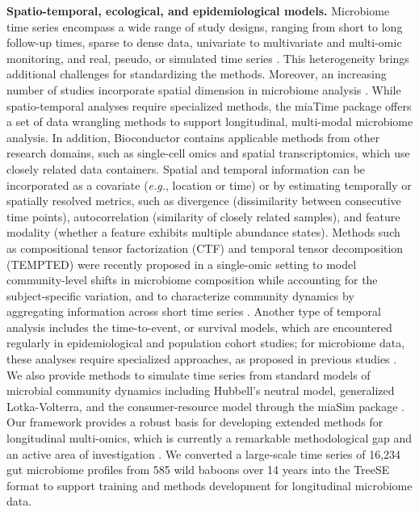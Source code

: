 \documentclass[
  sn-nature,
]{sn-jnl}
\begin{document}
\textbf{Spatio-temporal, ecological, and epidemiological models.}
Microbiome time series \citep{berg2020} encompass a wide range of study
designs, ranging from short to long follow-up times, sparse to dense
data, univariate to multivariate and multi-omic monitoring, and real,
pseudo, or simulated time series
\citep{velten2022, sherwani2025, fukuyama2017}. This heterogeneity
brings additional challenges for standardizing the methods. Moreover, an
increasing number of studies incorporate spatial dimension in microbiome
analysis \citep{ruuskanen2021}. While spatio-temporal analyses require
specialized methods, the miaTime package offers a set of data wrangling
methods to support longitudinal, multi-modal microbiome analysis. In
addition, Bioconductor contains applicable methods from other research
domains, such as single-cell omics and spatial transcriptomics, which
use closely related data containers. Spatial and temporal information
can be incorporated as a covariate (\emph{e.g.}, location or time) or by
estimating temporally or spatially resolved metrics, such as divergence
(dissimilarity between consecutive time points), autocorrelation
(similarity of closely related samples), and feature modality (whether a
feature exhibits multiple abundance states). Methods such as
compositional tensor factorization (CTF) \citep{martino2021} and
temporal tensor decomposition (TEMPTED) \citep{shi2024} were recently
proposed in a single-omic setting to model community-level shifts in
microbiome composition while accounting for the subject-specific
variation, and to characterize community dynamics by aggregating
information across short time series \citep{ross2026}. Another type of
temporal analysis includes the time-to-event, or survival models, which
are encountered regularly in epidemiological and population cohort
studies; for microbiome data, these analyses require specialized
approaches, as proposed in previous studies \citep{salosensaari2021}. We
also provide methods to simulate time series from standard models of
microbial community dynamics including Hubbell's neutral model,
generalized Lotka-Volterra, and the consumer-resource model through the
miaSim package \citep{gao2023}. Our framework provides a robust basis
for developing extended methods for longitudinal multi-omics, which is
currently a remarkable methodological gap and an active area of
investigation \citep{sherwani2025}. We converted a large-scale time
series of 16,234 gut microbiome profiles from 585 wild baboons over 14
years \citep{grieneisen2021} into the TreeSE format to support training
and methods development for longitudinal microbiome data.
\end{document}

